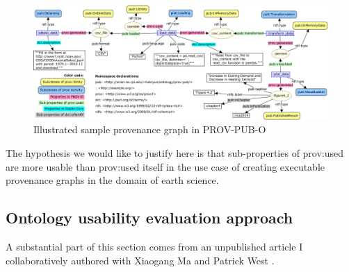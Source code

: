\begin{figure}
	\centering
	\includegraphics[width=\textwidth]{model/ontology/prov-pub/prov-pub-example.png}
	\caption{Illustrated sample provenance graph in PROV-PUB-O}
	\label{fig:prov-pub-example}
\end{figure}

The hypothesis we would like to justify here is that sub-properties of prov:used are more usable than prov:used itself in the use case of creating executable provenance graphs in the domain of earth science.




\subsection{Ontology usability evaluation approach}
\label{subsec:evaluation}

A substantial part of this section comes from an unpublished article I collaboratively authored with Xiaogang Ma and Patrick West \cite{fu2015ontology}.


